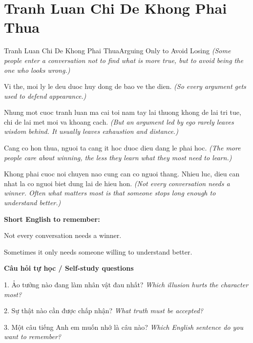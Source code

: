 \section{Tranh Luan Chi De Khong Phai Thua}
\begin{truyen}{Tranh Luan Chi De Khong Phai Thua}{Arguing Only to Avoid Losing}
\textit{(Some people enter a conversation not to find what is more true, but to avoid being the one who looks wrong.)}

Vi the, moi ly le deu duoc huy dong de bao ve the dien.
\textit{(So every argument gets used to defend appearance.)}

Nhung mot cuoc tranh luan ma cai toi nam tay lai thuong khong de lai tri tue, chi de lai met moi va khoang cach.
\textit{(But an argument led by ego rarely leaves wisdom behind. It usually leaves exhaustion and distance.)}

Cang co hon thua, nguoi ta cang it hoc duoc dieu dang le phai hoc.
\textit{(The more people care about winning, the less they learn what they most need to learn.)}

\end{truyen}

\begin{baihoc}
Khong phai cuoc noi chuyen nao cung can co nguoi thang. Nhieu luc, dieu can nhat la co nguoi biet dung lai de hieu hon.
\textit{(Not every conversation needs a winner. Often what matters most is that someone stops long enough to understand better.)}
\end{baihoc}

\begin{ghinhoanh}
\textbf{Short English to remember:}

Not every conversation needs a winner.

Sometimes it only needs someone willing to understand better.

\end{ghinhoanh}

\begin{tuhocnhanh}
\textbf{Câu hỏi tự học / Self-study questions}

1. Ảo tưởng nào đang làm nhân vật đau nhất? \textit{Which illusion hurts the character most?}

2. Sự thật nào cần được chấp nhận? \textit{What truth must be accepted?}

3. Một câu tiếng Anh em muốn nhớ là câu nào? \textit{Which English sentence do you want to remember?}
\end{tuhocnhanh}
\ngancach

